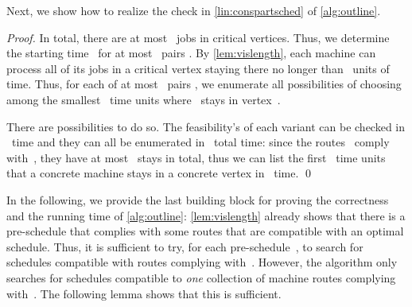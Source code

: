 \documentclass[natbib,sort,smallextended,envcountsame,envcountsect,numbook]{svjour3}
\begin{document}
\noindent
Next, we show how to realize the check in \ref{lin:conspartsched} of \cref{alg:outline}.

\begin{proof}
  In total, there are at most ~jobs in critical vertices.
  Thus, we determine the starting time~
  for at most ~pairs .
  By \cref{lem:vislength},
  each machine can process all of its jobs in a critical vertex staying there
  no longer than ~units of time.
  Thus, for each of at most ~pairs ,
  we enumerate all possibilities of choosing  among the
  smallest ~time units where~ stays in vertex~.

  There are 
  possibilities to do so.  The feasibility's of each variant
  can be checked in ~time and
  they can all be enumerated in ~total time:
  since the routes~ comply with~,
  they
  have at most ~stays in total,
  thus we can list the first ~time units
  that a concrete machine stays in a concrete vertex
  in ~time.
\qed\end{proof}

\noindent
In the following, we provide the last building block
for proving the correctness and the running time of \cref{alg:outline}:
\cref{lem:vislength} already shows that there is a pre-schedule
that complies with some routes that are compatible with
an optimal schedule.
Thus, it is sufficient to try, for each pre-schedule~,
to search for schedules compatible with routes
complying with~.
However, the algorithm only searches for schedules
compatible to \emph{one} collection of machine routes
complying with~.
The following lemma shows that this is sufficient.
\end{document}
